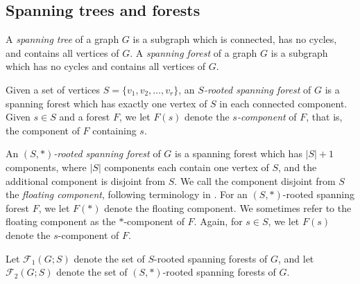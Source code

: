 \documentclass[12pt]{amsart}
\theoremstyle{definition}
\DeclareMathOperator{\conv}{conv}
\newcommand{\trees}{\mathcal{F}_1}
\newcommand{\forests}{\mathcal{F}}
\begin{document}






\subsection{Spanning trees and forests}

A {\em spanning tree} of a graph $G$ is a subgraph which 
is connected, has no cycles,
and contains all vertices of $G$.
A {\em spanning forest} of a graph $G$ is a subgraph which 
has no cycles
and  contains all vertices of $G$. 



Given a set of vertices $S = \{v_1, v_2, \ldots, v_r\}$,
an {\em $S$-rooted spanning forest} of $G$ 
is a spanning forest which has exactly one vertex of $S$ in each connected component.
Given $s \in S$ and a forest $F$, we let $F(s)$ denote the {\em $s$-component} of $F$, that is, the component of $F$ containing $s$.

An {\em $(S,*)$-rooted spanning forest} of $G$ is a spanning forest which has $|S|+1$ components, where $|S|$ components each contain one vertex of $S$, and the additional component is disjoint from $S$.
We call the component disjoint from $S$ the {\em floating component}, following terminology in \cite{kassel-kenyon-wu}.
For an $(S,*)$-rooted spanning forest $F$, we let $F(*)$ denote the floating component. We sometimes refer to the floating component as the $*$-component of $F$. Again, for $s \in S$, we let $F(s)$ denote the $s$-component of $F$.

Let $\trees(G;S)$ denote the set of $S$-rooted spanning forests of $G$,
and let $\forests_2(G;S)$ denote the set of $(S,*)$-rooted spanning forests of $G$.
\end{document}
